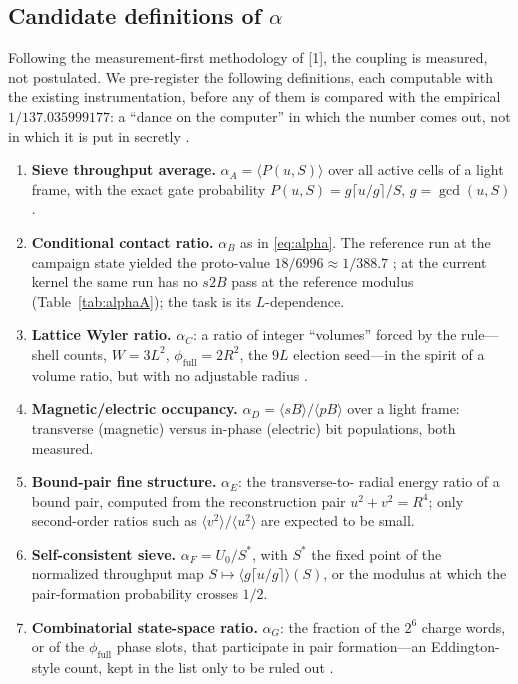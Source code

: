 \documentclass[11pt,a4paper]{article}
\begin{document}
\subsection{Candidate definitions of \texorpdfstring{$\alpha$}{alpha}}
\label{sec:candidates}

Following the measurement-first methodology of [1], the coupling is measured,
not postulated. We pre-register the following definitions, each computable
with the existing instrumentation, before any of them is compared with the
empirical $1/137.035999177$: a ``dance on the computer'' in which the number
comes out, not in which it is put in secretly \cite{feynman1985}.

\begin{enumerate}
  \item \textbf{Sieve throughput average.} $\alpha_A = \langle P(u,S)\rangle$
        over all active cells of a light frame, with the exact gate
        probability $P(u,S) = g\lceil u/g\rceil/S$, $g=\gcd(u,S)$
        \cite{itfrombit}.
  \item \textbf{Conditional contact ratio.} $\alpha_B$ as in
        \eqref{eq:alpha}. The reference run at the campaign state yielded the proto-value
        $18/6996 \approx 1/388.7$ \cite{itfrombit}; at the current kernel the
        same run has no $s2B$ pass at the reference modulus
        (Table~\ref{tab:alphaA}); the task is its $L$-dependence.
  \item \textbf{Lattice Wyler ratio.} $\alpha_C$: a ratio of integer
        ``volumes'' forced by the rule---shell counts, $W=3L^2$,
        $\phi_{\mathrm{full}}=2R^2$, the $9L$ election seed---in the spirit
        of a volume ratio, but with no adjustable radius
        \cite{wyler1969,robertson1971}.
  \item \textbf{Magnetic/electric occupancy.} $\alpha_D =
        \langle sB\rangle/\langle pB\rangle$ over a light frame: transverse
        (magnetic) versus in-phase (electric) bit populations, both measured.
  \item \textbf{Bound-pair fine structure.} $\alpha_E$: the transverse-to-
        radial energy ratio of a bound pair, computed from the reconstruction
        pair $u^2+v^2=R^4$; only second-order ratios such as
        $\langle v^2\rangle/\langle u^2\rangle$ are expected to be small.
  \item \textbf{Self-consistent sieve.} $\alpha_F = U_0/S^*$, with $S^*$ the
        fixed point of the normalized throughput map
        $S \mapsto \langle g\lceil u/g\rceil\rangle(S)$, or the modulus at
        which the pair-formation probability crosses $1/2$.
  \item \textbf{Combinatorial state-space ratio.} $\alpha_G$: the fraction of
        the $2^6$ charge words, or of the $\phi_{\mathrm{full}}$ phase slots,
        that participate in pair formation---an Eddington-style count, kept
        in the list only to be ruled out \cite{eddington1946}.
\end{enumerate}
\end{document}
